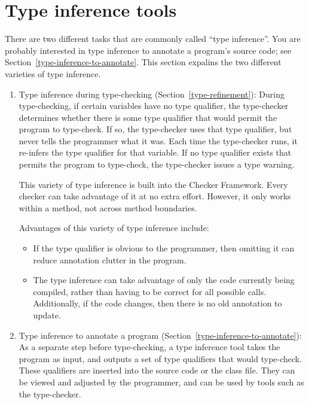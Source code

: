 \section{Type inference tools\label{type-inference-varieties}}

There are two different tasks that are commonly called ``type inference''.
You are probably interested in type inference to annotate a program's
source code; see Section~\ref{type-inference-to-annotate}.  This section
expalins the two different varieties of type inference.

\begin{enumerate}
\item
  Type inference during type-checking (Section~\ref{type-refinement}):
  During type-checking, if certain variables have no type qualifier, the
  type-checker determines whether there is some type qualifier that would
  permit the program to type-check.  If so, the type-checker uses that type
  qualifier, but never tells the programmer what it was.  Each time the
  type-checker runs, it re-infers the type qualifier for that variable.  If
  no type qualifier exists that permits the program to type-check, the
  type-checker issues a type warning.

  This variety of type inference is built into the Checker Framework.  Every
  checker can take advantage of it at no extra effort.  However, it only
  works within a method, not across method boundaries.

  Advantages of this variety of type inference include:
  \begin{itemize}
  \item
    If the type qualifier is obvious to the programmer, then omitting it
    can reduce annotation clutter in the program.
  \item
    The type inference can take advantage of only the code currently being
    compiled, rather than having to be correct for all possible calls.
    Additionally, if the code changes, then there is no old annotation to
    update.
  \end{itemize}


\item
  Type inference to annotate a program (Section~\ref{type-inference-to-annotate}):
  As a separate step before type-checking, a type inference tool takes the
  program as input, and outputs a set of type qualifiers that would
  type-check.  These qualifiers are inserted into the source code or the
  class file.  They can be viewed and adjusted by the programmer, and can
  be used by tools such as the type-checker.


\end{enumerate}
